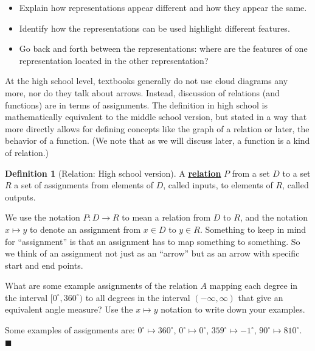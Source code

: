 \documentclass[11pt]{article}
\newenvironment{task}
	{\begin{mdframed}[linecolor=lightgray, linewidth=3pt]\raggedright}
	{\end{mdframed}}
\newcommand\degrees{^\circ}
\renewcommand\emph[1]{\underline{\bf{#1}}} %
\theoremstyle{definition}
\newtheorem{definition}[theorem]{Definition}
\newenvironment{solution}{{\it Solution.} }{\hfill {\color{lightgray}$\blacksquare$}}
\begin{document}
\begin{itemize}
\item Explain how representations appear different and how they appear the same.
\item Identify how the representations can be used highlight different features. 
\item Go back and forth between the representations: where are the features of one representation located in the other representation?
\end{itemize}

At the high school level, textbooks generally do not use cloud diagrams any more, nor do they talk about arrows. Instead, discussion of relations (and functions) are in terms of assignments. The definition in high school is mathematically equivalent to the middle school version, but stated in a way that more directly allows for defining concepts like the graph of a relation or later, the behavior of a function.  (We note that as we will discuss later, a function is a kind of relation.)

\begin{definition}[Relation: High school version]\label{d: relation high school}
A \emph{relation} $P$ from a set $D$ to a set $R$ a set of assignments from elements of $D$, called inputs, to elements of $R$, called outputs.
\end{definition}

\begin{note}
We use the notation $P:D\to R$ to mean a relation from $D$ to $R$, and the notation $x\mapsto y$ to denote an assignment from $x\in D$ to $y\in R$. Something to keep in mind for ``assignment'' is that an assignment has to map something to something. So we think of an assignment not just as an ``arrow'' but as an arrow with specific start and end points.
\end{note}

\begin{task}
What are some example assignments of the relation $A$ mapping each degree in the interval $[0\degrees, 360\degrees)$ to all degrees in the interval $(-\infty,\infty)$ that give an equivalent angle measure? Use the $x\mapsto y$ notation to write down your examples.
\end{task}

\begin{solution}
Some examples of assignments are: $0\degrees \mapsto 360\degrees$, $0\degrees \mapsto 0\degrees$, $359\degrees \mapsto -1\degrees$, $90\degrees \mapsto 810\degrees$.
\end{solution}
\end{document}

